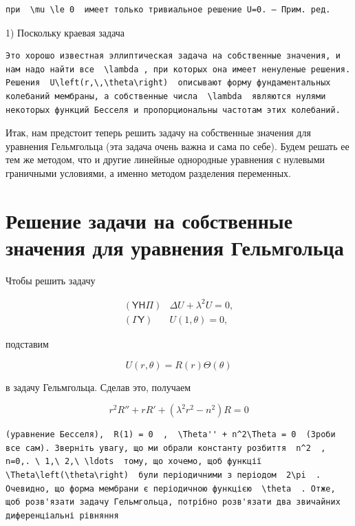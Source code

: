 \documentclass[
  ukrainian,
]{article}
\begin{document}
\begin{verbatim}
при  \mu \le 0  имеет только тривиальное решение U=0. — Прим. ред.
\end{verbatim}

1) Поскольку краевая задача

\begin{verbatim}
Это хорошо известная эллиптическая задача на собственные значения, и нам надо найти все  \lambda , при которых она имеет ненуленые решения. Решения  U\left(r,\,\theta\right)  описывают форму фундаментальных колебаний мембраны, а собственные числа  \lambda  являются нулями некоторых функций Бесселя и пропорциональны частотам этих колебаний.
\end{verbatim}

Итак, нам предстоит теперь решить задачу на собственные значения для
уравнения Гельмгольца (эта задача очень важна и сама по себе). Будем
решать ее тем же методом, что и другие линейные однородные уравнения с
нулевыми граничными условиями, а именно методом разделения переменных.

\section{Решение задачи на собственные значения для уравнения
Гельмгольца}\label{ux440ux435ux448ux435ux43dux438ux435-ux437ux430ux434ux430ux447ux438-ux43dux430-ux441ux43eux431ux441ux442ux432ux435ux43dux43dux44bux435-ux437ux43dux430ux447ux435ux43dux438ux44f-ux434ux43bux44f-ux443ux440ux430ux432ux43dux435ux43dux438ux44f-ux433ux435ux43bux44cux43cux433ux43eux43bux44cux446ux430}

Чтобы решить задачу

\[
\begin{array}{ll} (\mathsf{Y}\mathsf{H}\mathsf{\Pi}) & \Delta U + \lambda^2 U = 0, \\ (\mathsf{\Gamma}\mathsf{Y}) & U(1, \theta) = 0, \end{array}
\]

подставим

\[
U(r, \theta) = R(r) \Theta(\theta)
\]

в задачу Гельмгольца. Сделав это, получаем

\[
r^2R'' + rR' + (\lambda^2r^2 - n^2)R = 0
\]

\begin{verbatim}
(уравнение Бесселя),  R(1) = 0  ,  \Theta'' + n^2\Theta = 0  (Зроби все сам). Зверніть увагу, що ми обрали константу розбиття  n^2  ,  n=0,. \ 1,\ 2,\ \ldots  тому, що хочемо, щоб функції  \Theta\left(\theta\right)  були періодичними з періодом  2\pi  . Очевидно, що форма мембрани є періодичною функцією  \theta  . Отже, щоб розв'язати задачу Гельмгольца, потрібно розв'язати два звичайних диференціальні рівняння
\end{verbatim}
\end{document}
